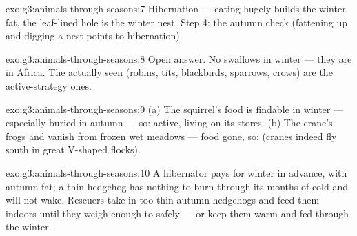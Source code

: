 \begin{solution}{exo:g3:animals-through-seasons:7}
Hibernation --- eating hugely builds the winter fat, the
leaf-lined hole is the winter nest. Step 4: the autumn check
(fattening up and digging a nest points to hibernation).
\end{solution}

\begin{solution}{exo:g3:animals-through-seasons:8}
Open answer. No swallows in winter --- they are in Africa. The
 actually seen (robins, tits, blackbirds, sparrows, crows)
are the active-strategy ones.
\end{solution}

\begin{solution}{exo:g3:animals-through-seasons:9}
(a) The squirrel's food is findable in winter --- especially
buried in autumn --- so: active, living on its stores. (b) The
crane's frogs and  vanish from frozen wet meadows ---
food gone, so:  (cranes indeed fly south in great
V-shaped flocks).
\end{solution}

\begin{solution}{exo:g3:animals-through-seasons:10}
A hibernator pays for winter in advance, with autumn fat; a
thin hedgehog has nothing to burn through its months of cold
 and will not wake. Rescuers take in too-thin autumn
hedgehogs and feed them indoors until they weigh enough to
 safely --- or keep them warm and fed through the
winter.
\end{solution}
